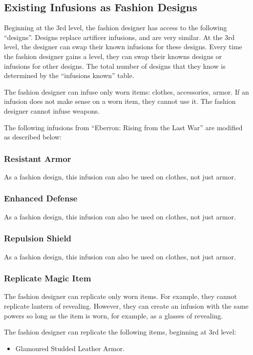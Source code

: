 \documentclass[twocolumn]{dndbook}
\begin{document}
\subsection{Existing Infusions as Fashion Designs}

Beginning at the 3rd level, the fashion designer has access to the following ``designs''.
Designs replace artificer infusions, and are very similar.
At the 3rd level, the designer can swap their known infusions for these designs.
Every time the fashion designer gains a level, they can swap their knowns designs or infusions for other designs.
The total number of designs that they know is determined by the ``infusions known'' table.\par

The fashion designer can infuse only worn items: clothes, accessories, armor.
If an infusion does not make sense on a worn item, they cannot use it.
The fashion designer cannot infuse weapons.\par

The following infusions from ``Eberron: Rising from the Last War'' are modified as described below:
\subsubsection{Resistant Armor}
As a fashion design, this infusion can also be used on clothes, not just armor.

\subsubsection{Enhanced Defense}
As a fashion design, this infusion can also be used on clothes, not just armor.

\subsubsection{Repulsion Shield}
As a fashion design, this infusion can also be used on clothes, not just armor.

\subsubsection{Replicate Magic Item}
The fashion designer can replicate only worn items. For example, they cannot replicate lantern of revealing.
However, they can create an infusion with the same powers so long as the item is worn, for example, as a glasses of revealing.

The fashion designer can replicate the following items, beginning at 3rd level:
\begin{itemize}
    \item Glamoured Studded Leather Armor.
\end{itemize}
\end{document}
